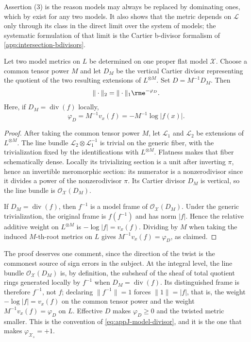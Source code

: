 Assertion (3) is the reason models may always be replaced by dominating
ones, which by  exist for any two models. It
also shows that the metric depends on $\mathcal L$ only through its class
in the direct limit over the system of models; the systematic formulation of
that limit is the Cartier b-divisor formalism of
\cref{app:intersection-bdivisors}.

\begin{proposition}\label{prop:metric-difference-model}
Let two model metrics on $L$ be determined on one proper flat model
$\mathcal X$. Choose a common tensor power $M$ and let $D_M$ be the
vertical Cartier divisor representing the quotient of the two resulting
extensions of $L^{\otimes M}$.  Set $D=M^{-1}D_M$.  Then
\[
                      \|\cdot\|_2=\|\cdot\|_1\rme^{-\varphi_D}.
\]
Here, if $D_M=\operatorname{div}(f)$ locally,
\[
       \varphi_D=M^{-1}v_x(f)=-M^{-1}\log|f(x)|.
\]
\end{proposition}

\begin{proof}
After taking the common tensor power $M$, let $\mathcal L_1$ and
$\mathcal L_2$ be extensions of $L^{\otimes M}$. The
line bundle $\mathcal L_2\otimes\mathcal L_1^{-1}$ is trivial on the
generic fiber, with the trivialization fixed by the identifications with
$L^{\otimes M}$. Flatness makes that fiber schematically dense. Locally
its trivializing section is a unit after inverting $\pi$, hence an
invertible meromorphic section: its numerator is a nonzerodivisor since
it divides a power of the nonzerodivisor $\pi$. Its Cartier divisor
$D_M$ is vertical, so
the line bundle is $\mathcal O_{\mathcal X}(D_M)$.

If $D_M=\operatorname{div}(f)$, then $f^{-1}$ is a model frame of
$\mathcal O_{\mathcal X}(D_M)$. Under the generic trivialization, the
original frame is $f(f^{-1})$ and has norm $|f|$. Hence the relative
additive weight on $L^{\otimes M}$ is $-\log|f|=v_x(f)$.  Dividing by
$M$ when taking the induced $M$-th-root metrics on $L$ gives
$M^{-1}v_x(f)=\varphi_D$, as claimed.
\end{proof}

The proof deserves one comment, since the direction of the twist is the
commonest source of sign errors in the subject. At the integral level, the
line bundle $\mathcal O_{\mathcal X}(D_M)$ is, by definition, the subsheaf
of the sheaf of total quotient rings generated locally by $f^{-1}$ when
$D_M=\operatorname{div}(f)$. Its distinguished frame is therefore
$f^{-1}$, not $f$; declaring $\|f^{-1}\|=1$ forces
$\|1\|=|f|$, that is, the weight $-\log|f|=v_x(f)$ on the common tensor
power and the weight $M^{-1}v_x(f)=\varphi_D$ on $L$. Effective $D$
makes $\varphi_D\ge0$ and the twisted metric smaller. This is the
convention of \eqref{eq:appJ-model-divisor}, and it is the one that makes
$\varphi_{\mathcal X_s}=+1$.


